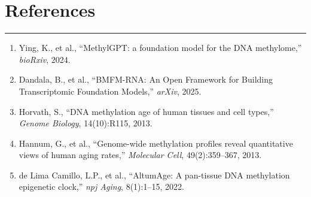 \documentclass[11pt]{article}
\begin{document}
\section*{References}
\vspace{-0.3em}
\hrule
\vspace{0.8em}
\begin{enumerate}[leftmargin=1.5em]
\item Ying, K., et al., ``MethylGPT: a foundation model for the DNA methylome,'' \emph{bioRxiv}, 2024.
\item Dandala, B., et al., ``BMFM-RNA: An Open Framework for Building Transcriptomic Foundation Models,'' \emph{arXiv}, 2025.
\item Horvath, S., ``DNA methylation age of human tissues and cell types,'' \emph{Genome Biology}, 14(10):R115, 2013.
\item Hannum, G., et al., ``Genome-wide methylation profiles reveal quantitative views of human aging rates,'' \emph{Molecular Cell}, 49(2):359--367, 2013.
\item de Lima Camillo, L.P., et al., ``AltumAge: A pan-tissue DNA methylation epigenetic clock,'' \emph{npj Aging}, 8(1):1--15, 2022.
\end{enumerate}
\end{document}
